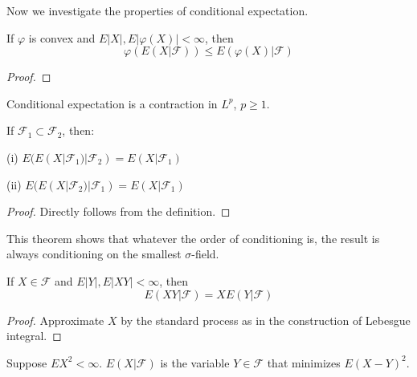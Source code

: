 Now we investigate the properties of conditional expectation.
\begin{theorem}

\end{theorem}
\begin{theorem}
If $\varphi$ is convex and $E\left|X\right|,E\left|\varphi(X)\right|<\infty$, then \[\varphi(E(X|\mathcal{F}))\le E(\varphi(X)|\mathcal{F})\]
\end{theorem}
\begin{proof}

\end{proof}
\begin{corollary}
Conditional expectation is a contraction in $L^p$, $p\ge 1$.
\end{corollary}
\begin{theorem}
If $\mathcal{F}_1\subset\mathcal{F}_2$, then:\par
(i) $E(E(X|\mathcal{F}_1)|\mathcal{F}_2)=E(X|\mathcal{F}_1)$\par
(ii) $E(E(X|\mathcal{F}_2)|\mathcal{F}_1)=E(X|\mathcal{F}_1)$
\end{theorem}
\begin{proof}
Directly follows from the definition.
\end{proof}
\begin{remark}
This theorem shows that whatever the order of conditioning is, the result is always conditioning on the smallest $\sigma$-field.
\end{remark}
\begin{theorem}
If $X\in\mathcal{F}$ and $E\left|Y\right|,E\left|XY\right|<\infty$, then \[E(XY|\mathcal{F})=XE(Y|\mathcal{F})\]
\end{theorem}
\begin{proof}
Approximate $X$ by the standard process as in the construction of Lebesgue integral.
\end{proof}
\begin{theorem}[LSE]
Suppose $EX^2<\infty$. $E(X|\mathcal{F})$ is the variable $Y\in\mathcal{F}$ that minimizes $E(X-Y)^2$.
\end{theorem}


